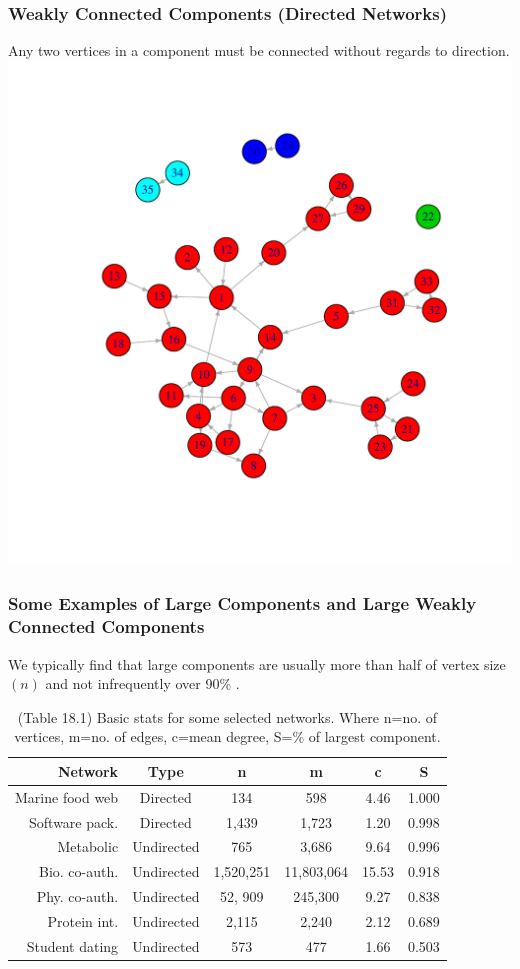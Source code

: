 \documentclass[smaller]{beamer}
\begin{document}
\begin{frame}
   \frametitle{Weakly Connected Components (Directed Networks)}
   Any two vertices in a component must be connected without regards to direction.
   \includegraphics[scale=0.5]{figures/weak_dg.pdf} 
\end{frame}

\begin{frame}
\frametitle{Some Examples of Large Components and Large Weakly 
                 Connected Components}
We typically find that large components are usually more than half of vertex size $(n)$ and not infrequently over 90\% .                
\begin{table}[ht]
\caption{(Table 18.1) Basic stats for some selected networks.
               Where n=no. of vertices, m=no. of edges, c=mean degree, S=\% of largest component.} 
\centering 
\begin{tabular}{r c c c c c}
\hline
Network & Type & n & m & c & S \\  \hline
Marine food web & Directed & 134 & 598 & 4.46 & 1.000 \\
Software pack. & Directed & 1,439 & 1,723 & 1.20 & 0.998 \\
Metabolic & Undirected & 765 & 3,686 & 9.64 & 0.996  \\
Bio. co-auth. & Undirected & 1,520,251 & 11,803,064 & 15.53 & 0.918 \\
Phy. co-auth. & Undirected & 52, 909 & 245,300  & 9.27 & 0.838 \\
Protein int.& Undirected & 2,115 & 2,240 & 2.12 & 0.689 \\
Student dating & Undirected & 573 & 477 & 1.66 & 0.503\\
\end{tabular}
\end{table}
\end{frame}
\end{document}

